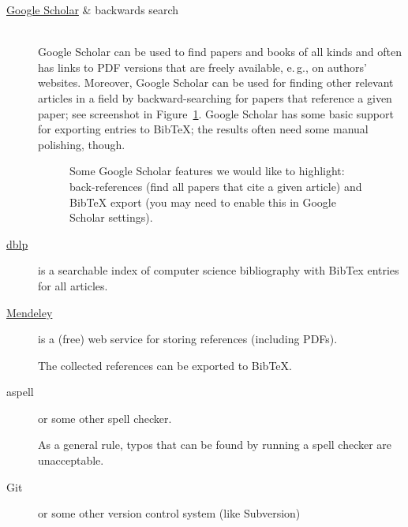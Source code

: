 \documentclass[]{tukseminar}
\begin{document}
\begin{description}
	\item[\href{http://scholar.google.com}{Google Scholar} \& backwards search]
		~\\ %
		Google Scholar can be used to find papers and books of all kinds and often has links to PDF versions that are freely available, e.\,g., on authors' websites.
		Moreover, Google Scholar can be used for finding other relevant articles in a field by backward-searching for papers that reference a given paper; see screenshot in Figure~\ref{fig:scholar}. %
		Google Scholar has some basic support for exporting entries to BibTeX; the results often need some manual polishing, though.

		\begin{figure}
			\begin{center}
			\end{center}
			\caption{%
				Some Google Scholar features we would like to highlight: back-references (find all papers that cite a given article) and BibTeX export (you may need to enable this in Google Scholar settings).
			}
			\label{fig:scholar} %
		\end{figure}

	\item[\href{http://dblp.uni-trier.de/}{dblp}] is a searchable index of computer science bibliography with BibTex entries for all articles.

	\item[\href{http://www.mendeley.com}{Mendeley}] is a (free) web service for storing references (including PDFs).

		The collected references can be exported to BibTeX.

	\item[aspell] or some other spell checker.

		As a general rule, typos that can be found by running a spell checker are unacceptable.

	\item[Git] or some other version control system (like Subversion)


\end{description}
\end{document}
